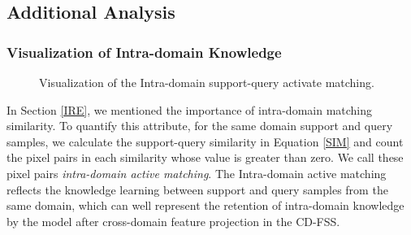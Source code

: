 \documentclass{bmvc2k}
\begin{document}
\subsection{Additional Analysis}
\subsubsection{Visualization of Intra-domain Knowledge}
\begin{figure}
	\centering
	\hspace{-3mm}
  \vspace {-0.5cm}
	\caption{Visualization of the Intra-domain support-query activate matching.}
	\label{fig2}
\end{figure}
In Section \ref{IRE}, we mentioned the importance of intra-domain matching similarity.
To quantify this attribute, for the same domain support and query samples, we calculate the support-query similarity in Equation \ref{SIM} and count the pixel pairs in each similarity whose value is greater than zero.
We call these pixel pairs \textit{intra-domain active matching}.
The Intra-domain active matching reflects the knowledge learning between support and query samples from the same domain, which can well represent the retention of intra-domain knowledge by the model after cross-domain feature projection in the CD-FSS.
\end{document}
